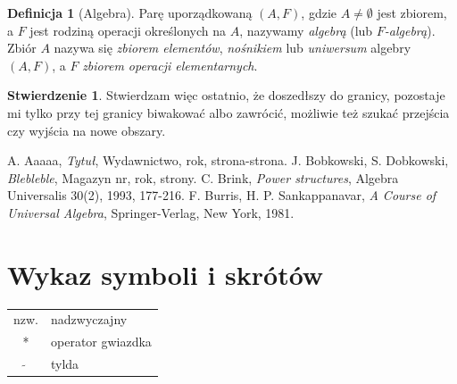 \documentclass[a4paper,11pt,twoside]{report}
\theoremstyle{definition}
\newtheorem{proposition}[theorem]{Stwierdzenie}
\newtheorem{definition}[theorem]{Definicja}
\begin{document}
\begin{definition}[Algebra]
Parę uporządkowaną $(A,F)$, gdzie $A\neq \emptyset$ jest zbiorem, a $F$ jest rodziną operacji określonych na $A$, nazywamy \textit{algebrą} (lub \textit{$F$-algebrą}). Zbiór $A$ nazywa się \textit{zbiorem elementów}, \textit{nośnikiem} lub \textit{uniwersum} algebry $(A,F)$, a $F$ \textit{zbiorem operacji elementarnych}.
\end{definition}

\begin{proposition}
Stwierdzam więc ostatnio, że doszedłszy do granicy, pozostaje mi tylko przy tej granicy biwakować albo zawrócić, możliwie też szukać przejścia czy wyjścia na nowe obszary.
\end{proposition}




\begin{thebibliography}{20}%

 A. Aaaaa, \emph{Tytuł}, Wydawnictwo, rok, strona-strona.
 J. Bobkowski, S. Dobkowski, \emph{Blebleble}, Magazyn nr, rok, strony.
 C. Brink, \emph{Power structures}, Algebra Universalis 30(2), 1993, 177-216.
 F. Burris, H. P. Sankappanavar, \emph{A Course of Universal Algebra}, Springer-Verlag, New York, 1981.
\end{thebibliography}
\thispagestyle{empty}


\chapter*{Wykaz symboli i skrótów}

\begin{tabular}{cl}
nzw. & nadzwyczajny \\
* & operator gwiazdka \\
$\widetilde{}$ & tylda
\end{tabular}
\thispagestyle{empty}


\listoffigures
\thispagestyle{empty}


\renewcommand{\listtablename}{Spis tabel}
\listoftables
\thispagestyle{empty}
\end{document}
